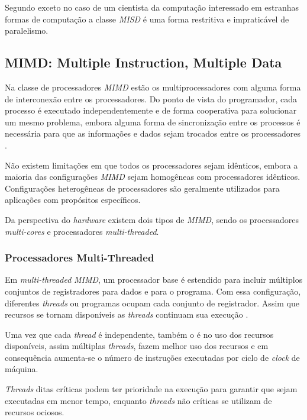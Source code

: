 Segundo \cite{Openshaw:1999} exceto no caso de um cientista da computação
interessado em estranhas formas de computação a classe \textit{MISD} é uma forma
restritiva e impraticável de paralelismo.

\subsection{MIMD: Multiple Instruction, Multiple Data}

Na classe de processadores \textit{MIMD} estão os multiprocessadores
com alguma forma de interconexão entre os processadores. Do ponto de vista do
programador, cada processo é executado independentemente e de forma cooperativa
para solucionar um mesmo problema, embora alguma forma de sincronização entre os
processos é necessária para que as informações e dados sejam trocados entre os
processadores \cite{eopc}.

Não existem limitações em que todos os processadores sejam idênticos, embora a
maioria das configurações \textit{MIMD} sejam homogêneas com processadores
idênticos. Configurações heterogêneas de processadores são geralmente utilizados
para aplicações com propósitos específicos.

Da perspectiva do \textit{hardware} existem dois tipos de \textit{MIMD}, sendo os
processadores \textit{multi-cores} e processadores \textit{multi-threaded}.


\subsubsection{Processadores Multi-Threaded}

Em \textit{multi-threaded} \textit{MIMD}, um processador base é
estendido para incluir múltiplos conjuntos de registradores para dados e para o
programa.
Com essa configuração, diferentes \textit{threads} ou programas ocupam cada
conjunto de registrador. Assim que recursos se tornam disponíveis as
\textit{threads} continuam sua execução \cite{Flynn:1996}.

Uma vez que cada \textit{thread} é independente, também o é no uso dos recursos
disponíveis, assim múltiplas \textit{threads}, fazem melhor uso dos recursos e
em consequência aumenta-se o número de instruções executadas por ciclo de
\textit{clock} de máquina.

\textit{Threads} ditas críticas podem ter prioridade na execução para garantir
que sejam executadas em menor tempo, enquanto \textit{threads} não críticas se
utilizam de recursos ociosos.



